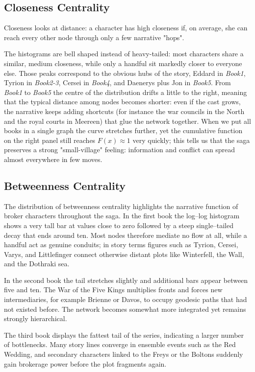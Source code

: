 \documentclass[12pt, a4paper]{article}
\begin{document}
\subsection*{Closeness Centrality}
Closeness looks at distance: a character has high closeness if,
on average, she can reach every other node through only a few narrative "hops".


The histograms are bell shaped instead of heavy-tailed: most characters share a similar, medium closeness, while only a handful sit markedly closer to everyone else.  Those peaks correspond to the obvious hubs of the story, Eddard in \emph{Book1}, Tyrion in \emph{Book2-3}, Cersei in \emph{Book4}, and Daenerys plus Jon in \emph{Book5}.
From \emph{Book1} to \emph{Book5} the centre of the distribution drifts a little to the right, meaning that the typical distance among nodes becomes shorter: even if the cast grows, the narrative keeps adding shortcuts (for instance the war councils in the North and the royal courts in Meereen) that glue the network together.
When we put all books in a single graph the curve stretches further, 
yet the cumulative function on the right panel still reaches $F(x)\approx1$ 
very quickly; this tells us that the saga preserves a strong "small-village" feeling: 
information and conflict can spread almost everywhere in  few moves.

\subsection*{Betweenness Centrality}
The distribution of betweenness centrality highlights the narrative function of broker characters throughout the saga. In the first book the log–log histogram shows a very tall bar at values close to zero followed by a steep single–tailed decay that ends around ten. Most nodes therefore mediate no flow at all, while a handful act as genuine conduits; in story terms figures such as Tyrion, Cersei, Varys, and Littlefinger connect otherwise distant plots like Winterfell, the Wall, and the Dothraki sea.

In the second book the tail stretches slightly and additional bars appear between five and ten. The War of the Five Kings multiplies fronts and forces new intermediaries, for example Brienne or Davos, to occupy geodesic paths that had not existed before. The network becomes somewhat more integrated yet remains strongly hierarchical.

The third book displays the fattest tail of the series, indicating a larger number of bottlenecks. Many story lines converge in ensemble events such as the Red Wedding, and secondary characters linked to the Freys or the Boltons suddenly gain brokerage power before the plot fragments again.
\end{document}
